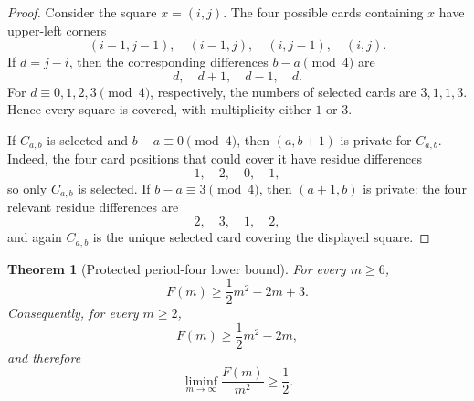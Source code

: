 \documentclass[11pt]{article}
\newtheorem{theorem}{Theorem}[section]
\begin{document}
	\begin{proof}
		Consider the square \(x=(i,j)\).  The four possible cards containing \(x\) have
		upper-left corners
		\[
		(i-1,j-1),\quad(i-1,j),\quad(i,j-1),\quad(i,j).
		\]
		If \(d=j-i\), then the corresponding differences \(b-a\pmod4\) are
		\[
		d,\quad d+1,\quad d-1,\quad d.
		\]
		For \(d\equiv0,1,2,3\pmod4\), respectively, the numbers of selected cards are
		\(3,1,1,3\).  Hence every square is covered, with multiplicity either \(1\) or
		\(3\).
		
		If \(C_{a,b}\) is selected and \(b-a\equiv0\pmod4\), then \((a,b+1)\) is
		private for \(C_{a,b}\).  Indeed, the four card positions that could cover it
		have residue differences
		\[
		1,\quad2,\quad0,\quad1,
		\]
		so only \(C_{a,b}\) is selected.  If \(b-a\equiv3\pmod4\), then \((a+1,b)\)
		is private: the four relevant residue differences are
		\[
		2,\quad3,\quad1,\quad2,
		\]
		and again \(C_{a,b}\) is the unique selected card covering the displayed
		square.
	\end{proof}
	
	\begin{theorem}[Protected period-four lower bound]
		\label{thm:staircase-lower-bound}
		For every \(m\ge6\),
		\[
		F(m)\ge\frac12m^2-2m+3.
		\]
		Consequently, for every \(m\ge2\),
		\[
		F(m)\ge\frac12m^2-2m,
		\]
		and therefore
		\[
		\liminf_{m\to\infty}\frac{F(m)}{m^2}\ge\frac12.
		\]
	\end{theorem}
	
\end{document}
